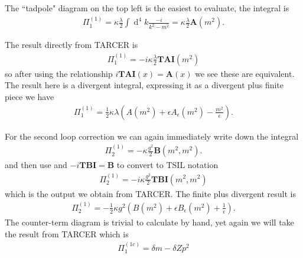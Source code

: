 \documentclass[11pt]{article}
\renewcommand{\d}{\ensuremath{\operatorname{d}\!}}
\newcommand{\tsil}{\textsf{TSIL} }
\newcommand{\tarcer}{\textsf{TARCER} }
\newcommand{\tarcers}{\textsf{TARCER}}
\begin{document}
\noindent\begin{minipage}{0.7\textwidth}
The ``tadpole" diagram on the top left is the easiest to evaluate, the integral is
\begin{align}
\Pi^{(1)}_1 =  \kappa\frac{\lambda}{2} \int \d^4k \frac{-i}{k^2-m^2} =  \kappa \frac{\lambda}{2} \mathbf{A}(m^2).
\end{align}

The result directly from \tarcer is
\begin{align}
\Pi^{(1)}_1 = -i \kappa \frac{\lambda}{2} \mathbf{TAI}(m^2)
\end{align}
so after using the relationship $i\mathbf{TAI}(x) = \mathbf{A}(x)$ we see these are equivalent.  The result here is a divergent integral, expressing it as a divergent plus finite piece we have
\begin{align}
\Pi^{(1)}_1 = \frac{1}{2}\kappa\lambda\left(A(m^2)+\epsilon A_{\epsilon}(m^2)-\frac{m^2}{\epsilon}\right).\label{eqn:scalar_1}
\end{align}

\end{minipage}

For the second loop correction we can again immediately write down the integral
\begin{align}
\Pi^{(1)}_2 = -\kappa \frac{g^2}{2} \mathbf{B}(m^2,m^2).
\end{align}
 and then use and $-i\mathbf{TBI} = \mathbf{B}$ to convert to \tsil notation
\begin{align}
\Pi^{(1)}_2 =-i \kappa \frac{g^2}{2} \mathbf{TBI}(m^2,m^2)
\end{align}
which is the output we obtain from \tarcers.  The finite plus divergent result is
\begin{align}
\Pi^{(1)}_2 = - \frac{1}{2}\kappa g^2\left(B(m^2)+\epsilon B_{\epsilon}(m^2)+\frac{1}{\epsilon}\right).\label{eqn:scalar_2}
\end{align}
The counter-term diagram is trivial to calculate by hand, yet again we will take the result from \tarcer which is
\begin{align}
\Pi^{(1c)}_1 =  \delta m - \delta Z p^2
\end{align}
\end{document}
